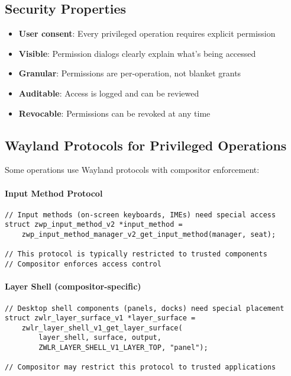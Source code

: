 \subsection{Security Properties}

\begin{itemize}
    \item \textbf{User consent}: Every privileged operation requires explicit permission
    \item \textbf{Visible}: Permission dialogs clearly explain what's being accessed
    \item \textbf{Granular}: Permissions are per-operation, not blanket grants
    \item \textbf{Auditable}: Access is logged and can be reviewed
    \item \textbf{Revocable}: Permissions can be revoked at any time
\end{itemize}

\subsection{Wayland Protocols for Privileged Operations}

Some operations use Wayland protocols with compositor enforcement:

\paragraph{Input Method Protocol}

\begin{lstlisting}[style=cstyle, caption=Input Method (Trusted Component)]
// Input methods (on-screen keyboards, IMEs) need special access
struct zwp_input_method_v2 *input_method =
    zwp_input_method_manager_v2_get_input_method(manager, seat);

// This protocol is typically restricted to trusted components
// Compositor enforces access control
\end{lstlisting}

\paragraph{Layer Shell (compositor-specific)}

\begin{lstlisting}[style=cstyle, caption=Layer Shell for Desktop Components]
// Desktop shell components (panels, docks) need special placement
struct zwlr_layer_surface_v1 *layer_surface =
    zwlr_layer_shell_v1_get_layer_surface(
        layer_shell, surface, output,
        ZWLR_LAYER_SHELL_V1_LAYER_TOP, "panel");

// Compositor may restrict this protocol to trusted applications
\end{lstlisting}

